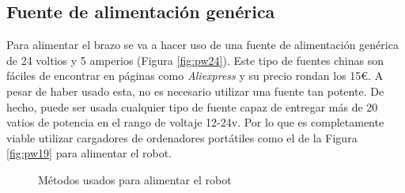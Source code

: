 \newpage
\subsection{Fuente de alimentación genérica}
\label{subsec:fuente_alimentacion}
\noindent Para alimentar el brazo se va a hacer uso de una fuente de alimentación genérica de 24 voltios y 5 amperios (Figura \ref{fig:pw24}). Este tipo de fuentes chinas son 
fáciles de encontrar en páginas como \textit{Aliexpress} y su precio rondan los 15\euro. A pesar de haber usado esta, no es 
necesario utilizar una fuente tan potente. De hecho, puede ser usada cualquier tipo de fuente capaz de 
entregar más de 20 vatios de potencia en el rango de voltaje 12-24v. Por lo que es completamente viable utilizar cargadores de ordenadores 
portátiles como el de la Figura \ref{fig:pw19} para alimentar el robot.

\begin{figure} [h!]
  \centering   
  \hspace{3cm}
  \caption{Métodos usados para alimentar el robot}
\end{figure}


